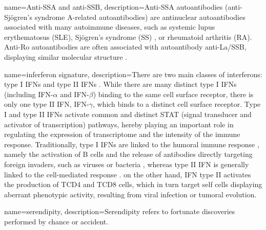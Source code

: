 {name={Anti-SSA and anti-SSB}, 
description={Anti-SSA autoantibodies (anti-Sjögren's syndrome A-related autoantibodies) are antinuclear autoantibodies 
associated with many autoimmune diseases, such as systemic lupus erythematosus (SLE), 
Sjögren's syndrome (SS) \autocite{franceschini_cavazzana05} \autocite{goeb_etal07}, or rheumatoid arthritis (RA). Anti-Ro autoantibodies are often associated 
with autoantibody anti-La/SSB, displaying similar molecular structure \autocite{gleicher_elkayam13}.
}}

{name=inferferon signature, 
description={There are two main classes of interferons: type I IFNs and type II IFNs \autocite{lee_ashkar18} \autocite{platanias05}. While there are many distinct type I IFNs (including IFN-$\alpha$ and IFN-$\beta$) binding to the same cell surface receptor, there is only one type II IFN, IFN-$\gamma$, which binds to a distinct cell surface receptor. Type I and type II IFNs activate common and distinct STAT (signal transducer and activator of transcription) pathways, hereby playing an important role in regulating the expression of transcriptome and the intensity of the immune response. 
Traditionally, type I IFNs are linked to the humoral immune response \autocite{lebon_etal01}, namely the activation of B cells and the release of antibodies directly targeting foreign invaders, such as viruses or bacteria \autocite{zajac_harrington14}, whereas type II IFN is generally linked to the cell-mediated response \autocite{murray_etal02}. on the other hand, IFN type II activates the production of TCD4 and TCD8 cells, which in turn target self cells displaying aberrant phenotypic activity, resulting from viral infection or tumoral evolution.
 }}
 
{name=serendipity, 
description={Serendipity refers to fortunate discoveries performed by chance or accident.}
 }
 
